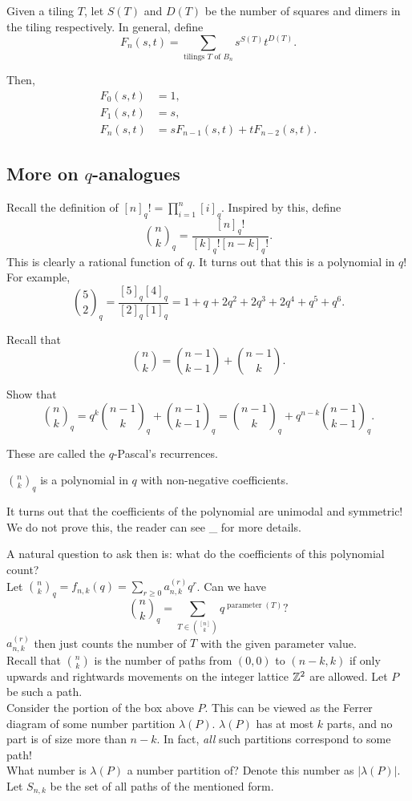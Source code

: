 	Given a tiling $T$, let $S(T)$ and $D(T)$ be the number of squares and dimers in the tiling respectively.
	In general, define
	\[ F_n(s,t) = \sum_{\text{tilings $T$ of $B_n$}} s^{S(T)} t^{D(T)}. \]

	Then,
	\begin{align*}
		F_0(s,t) &= 1, \\
		F_1(s,t) &= s, \\
		F_n(s,t) &= sF_{n-1}(s,t) + tF_{n-2}(s,t).
	\end{align*}

\subsection{More on $q$-analogues}

	Recall the definition of $[n]_q! = \prod_{i=1}^n [i]_q$. Inspired by this, define
	\[ \binom{n}{k}_q = \frac{[n]_q!}{[k]_q![n-k]_q!}. \]
	This is clearly a rational function of $q$. It turns out that this is a polynomial in $q$! For example,
	\[ \binom{5}{2}_q = \frac{[5]_q[4]_q}{[2]_q[1]_q} = 1 + q + 2q^2 + 2q^3 + 2q^4 + q^5 + q^6. \]

	Recall that
	\[ \binom{n}{k} = \binom{n-1}{k-1} + \binom{n-1}{k}. \]

	\begin{exercise}
		Show that
		\[ \binom{n}{k}_q = q^k \binom{n-1}{k}_q + \binom{n-1}{k-1}_q = \binom{n-1}{k}_q + q^{n-k} \binom{n-1}{k-1}_q . \]
	\end{exercise}
	These are called the $q$-Pascal's recurrences.

	\begin{fcor}
		$\binom{n}{k}_q$ is a polynomial in $q$ with non-negative coefficients.
	\end{fcor}
	It turns out that the coefficients of the polynomial are unimodal and symmetric! We do not prove this, the reader can see \_ for more details.


	A natural question to ask then is: what do the coefficients of this polynomial count?\\
	Let $\binom{n}{k}_q = f_{n,k}(q) = \sum_{r \ge 0} a_{n,k}^{(r)} q^r$.
	Can we have
	\[ \binom{n}{k}_q = \sum_{T \in \binom{[n]}{k}} q^{\operatorname{parameter}(T)}? \]
	$a_{n,k}^{(r)}$ then just counts the number of $T$ with the given parameter value.\\
	Recall that $\binom{n}{k}$ is the number of paths from $(0,0)$ to $(n-k,k)$ if only upwards and rightwards movements on the integer lattice $\mathbb{Z}^2$ are allowed. Let $P$ be such a path.\\
	Consider the portion of the box above $P$. This can be viewed as the Ferrer diagram of some number partition $\lambda(P)$. $\lambda(P)$ has at most $k$ parts, and no part is of size more than $n-k$. In fact, \emph{all} such partitions correspond to some path!\\
	What number is $\lambda(P)$ a number partition of? Denote this number as $|\lambda(P)|$. Let $S_{n,k}$ be the set of all paths of the mentioned form. 

